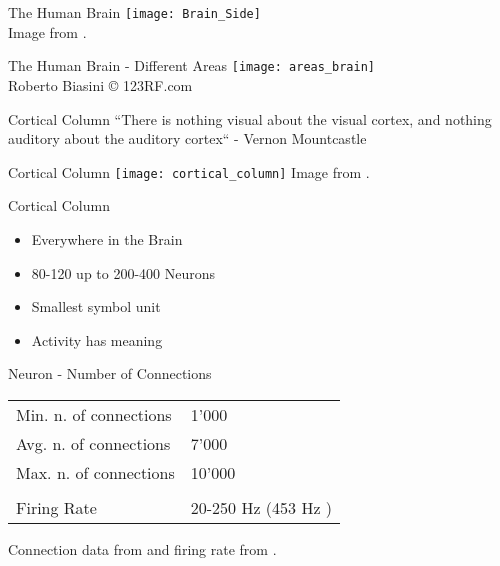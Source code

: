 \begin{frame}[c]{The Human Brain}
    \texttt{[image: Brain\_Side]} \\
    \normalsize
    Image from \cite{figsidebrain}.
\end{frame}


\begin{frame}[c]{The Human Brain - Different Areas}
    \texttt{[image: areas\_brain]} \\
    \normalsize
    Roberto Biasini © 123RF.com
\end{frame}


\begin{frame}[c]{Cortical Column}
    \Large
    ``There is nothing visual about the visual cortex, and nothing auditory about the auditory cortex``
    \newline
    \phantom{AA} - Vernon Mountcastle
\end{frame}

\begin{frame}[c]{Cortical Column}
    \texttt{[image: cortical\_column]}
    \normalsize
    Image from \cite{figcorticalcolumn}.
\end{frame}


\begin{frame}[c]{Cortical Column}
    \Large
    \begin{itemize}[<+->]
        \item Everywhere in the Brain
        \item 80-120 up to 200-400 Neurons
        \item Smallest symbol unit
        \item Activity has meaning
    \end{itemize}
\end{frame}



\begin{frame}[c]{Neuron - Number of Connections}
    \pause
    \vfill %
    \begin{tabular}{ll}
        Min. n. of connections \phantom{AAA} & 1'000 \\
        Avg. n. of connections & 7'000 \\
        Max. n. of connections & 10'000 \\ \\ \pause
        Firing Rate & 20-250 Hz (453 Hz \cite{wang2016firing}) \\
    \end{tabular}
    \newline
    \vfill
    \small
    Connection data from \cite{herculano2009human} and firing rate from \cite{impact2015firing}.
\end{frame}


